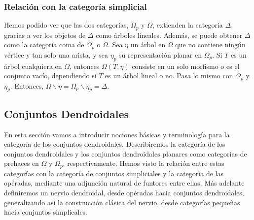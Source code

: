 \documentclass[../main.tex]{subfiles}
\begin{document}
\subsubsection{Relaci\'on con la categor\'ia simplicial}

Hemos podido ver que las dos categor\'ias, $\Omega_p$ y $\Omega$, extienden la categor\'ia $\Delta$, gracias a ver los objetos de $\Delta$ como \'arboles lineales. Adem\'as, se puede obtener $\Delta$ como la categor\'ia coma de $\Omega_p$ o $\Omega$.
Sea $\eta$ un \'arbol en $\Omega$ que no contiene ning\'un v\'ertice y tan solo una arista, y sea $\eta_p$ su representaci\'on planar en $\Omega_p$.
Si $T$ es un \'arbol cualquiera en $\Omega$, entonces $\Omega(T,\eta)$ consiste en un solo morfismo o es el conjunto vac\'io, dependiendo si $T$ es un \'arbol lineal o no. Pasa lo mismo con $\Omega_p$ y $\eta_p$. Entonces, $\Omega\backslash\eta = \Omega_p\backslash\eta_p = \Delta$.

\subsection{Conjuntos Dendroidales}
En esta secci\'on vamos a introducir nociones b\'asicas y terminolog\'ia para la categor\'ia de los conjuntos dendroidales. Describiremos la categor\'ia de los conjuntos dendroidales y los conjuntos dendroidales planares como categor\'ias de prehaces en $\Omega$ y $\Omega_p$, respectivamente.
Hemos visto la relaci\'on entre estas categor\'ias con la categor\'ia de conjuntos simpliciales y la categor\'ia de las op\'eradas, mediante una adjunci\'on natural de funtores entre ellas. M\'as adelante definiremos un nervio dendroidal, desde op\'eradas hacia conjuntos dendroidales, generalizando as\'i la construcci\'on cl\'asica del nervio, desde categor\'ias peque\~{n}as hacia conjuntos simplicales.
\end{document}
